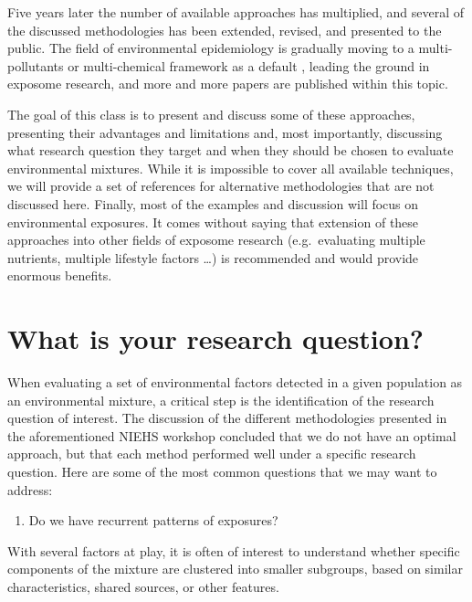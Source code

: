 \documentclass[
]{book}
\providecommand{\tightlist}{%
  \setlength{\itemsep}{0pt}\setlength{\parskip}{0pt}}
\begin{document}
Five years later the number of available approaches has multiplied, and several of the discussed methodologies has been extended, revised, and presented to the public. The field of environmental epidemiology is gradually moving to a multi-pollutants or multi-chemical framework as a default \citep{dominici2010protecting}, leading the ground in exposome research, and more and more papers are published within this topic.

The goal of this class is to present and discuss some of these approaches, presenting their advantages and limitations and, most importantly, discussing what research question they target and when they should be chosen to evaluate environmental mixtures. While it is impossible to cover all available techniques, we will provide a set of references for alternative methodologies that are not discussed here. Finally, most of the examples and discussion will focus on environmental exposures. It comes without saying that extension of these approaches into other fields of exposome research (e.g.~evaluating multiple nutrients, multiple lifestyle factors \dots) is recommended and would provide enormous benefits.

\hypertarget{what-is-your-research-question}{%
\section{What is your research question?}\label{what-is-your-research-question}}

When evaluating a set of environmental factors detected in a given population as an environmental mixture, a critical step is the identification of the research question of interest. The discussion of the different methodologies presented in the aforementioned NIEHS workshop concluded that we do not have an optimal approach, but that each method performed well under a specific research question. Here are some of the most common questions that we may want to address:

\begin{enumerate}
\def\labelenumi{\arabic{enumi}.}
\tightlist
\item
  Do we have recurrent patterns of exposures?
\end{enumerate}

With several factors at play, it is often of interest to understand whether specific components of the mixture are clustered into smaller subgroups, based on similar characteristics, shared sources, or other features.
\end{document}
